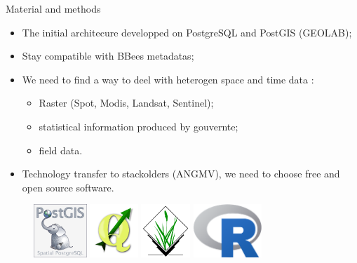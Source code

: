 \documentclass[newPxFont]{beamer}
\begin{document}
\begin{frame}[c]{Material and methods}
\vspace{-1cm}
\begin{itemize}
	\item The initial architecure developped on PostgreSQL and PostGIS (GEOLAB);
	\item Stay compatible with BBees metadatas;
	\item We need to find a way to deel with heterogen space and time data :
	\begin{itemize}
		\item Raster (Spot, Modis, Landsat, Sentinel);
		\item statistical information produced by gouvernte;
		\item field data.
	\end{itemize}
	\item Technology transfer to stackolders (ANGMV), we need to choose free and open source software.
\end{itemize}
\begin{figure}
	\centering
	\includegraphics[height=20mm]{img/PostGIS_logo}
	\includegraphics[height=20mm]{img/QGis_Logo}
	\includegraphics[height=20mm]{img/GrassGIS_banner}
	\includegraphics[height=20mm]{img/Rlogo}
\end{figure}
\end{frame}

\end{document}
